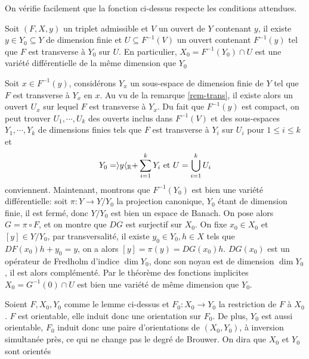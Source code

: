 \documentclass[memoire.tex]{subfiles}
\begin{document}
On vérifie facilement que la 
fonction ci-dessus respecte les 
conditions attendues.\\


\begin{lemme}\label{lemme-furi-1}
    Soit $(F,X,y)$ un triplet 
    admissible et $V$ un ouvert de 
    $Y$ contenant $y$, il  existe 
    $y\in Y_0\subseteq Y$ de dimension 
    finie et $U\subseteq F^{-1}(V)
    $ un ouvert contenant 
    $F^{-1}(y)$ tel que $F$ est 
    transverse à $Y_0$ sur $U$. En particulier, $X_0=F^{-1}(Y_0)\cap U$ est une variété différentielle de la même dimension que $Y_0$
\end{lemme}
\begin{preuve}
    Soit $x\in F^{-1}(y)$, 
    considérons $Y_x$ un sous-espace de dimension finie de 
    $Y$ tel que $F$ est transverse à
    $Y_x$ en $x$. Au vu de la remarque \ref{rem-trans}, il existe alors un ouvert $U_x$ sur 
    lequel $F$  est transverse à 
    $Y_x$. Du fait que $F^{-1}(y)$ est compact, on peut trouver $U_1,\cdots, U_k$ des ouverts inclus dans $F^{-1}(V)$ et des sous-espaces $Y_1,\cdots , Y_k$ de dimensions finies tels que $F$ est transverse à $Y_i$ sur $U_i$ pour $1\leq i\leq k$ et
    \begin{equation*}
    Y_0=\rangle y\langle_{\mathbb{R}}+\sum_{i=1}^{k} Y_i
    \text{ et } U=\bigcup_{i=1}^k U_i
    \end{equation*} conviennent.
    Maintenant, montrons que $F^{-1}(Y_0)$ est bien une variété différentielle: soit $\pi: Y\rightarrow Y/Y_0$ la projection canonique, $Y_0$ étant de dimension finie, il est fermé, donc $Y/Y_0$ est bien un espace de Banach. On pose alors $G=\pi\circ F$, et on montre que $DG$ est surjectif sur $X_0$. On fixe $x_0\in X_0$ et $[y]\in Y/Y_0$, par transversalité, il existe $y_0\in Y_0,h\in X$ tels que $DF(x_0)h+y_0=y$, on a alors $[y]=\pi(y)=DG(x_0)h$. $DG(x_0)$ est un opérateur de Fredholm d'indice $\dim Y_0$, donc son noyau est de dimension $\dim Y_0$, il est alors complémenté. Par le théorème des fonctions implicites $X_0=G^{-1}(0)\cap U$ est bien une variété de même dimension que $Y_0$.
\end{preuve}

\begin{definition}
    Soient $F,X_0,Y_0$ comme le lemme ci-dessus et $F_0:X_0\rightarrow Y_0$ la restriction de $F$ à $X_0$. $F$ est orientable, elle induit donc une orientation sur $F_0$. De plus, $Y_0$ est aussi orientable, $F_0$ induit donc une paire d'orientations de $(X_0,Y_0)$, à inversion simultanée près, ce qui ne change pas le degré de Brouwer. On dira que $X_0$ et $Y_0$ sont orientés 
\end{definition}
\end{document}
